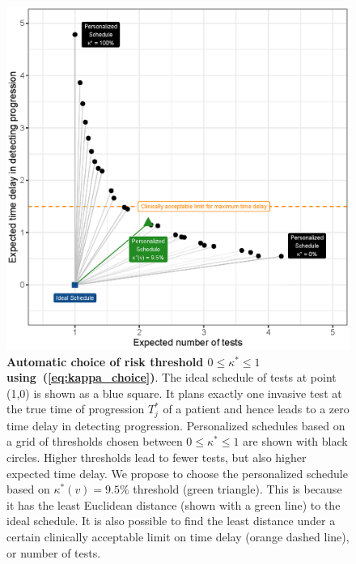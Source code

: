 \begin{figure}
\centerline{\includegraphics{images/kappa_choice_102.eps}}
\caption{\textbf{Automatic choice of risk threshold $0 \leq \kappa^* \leq 1$ using~(\ref{eq:kappa_choice})}. The ideal schedule of tests at point (1,0) is shown as a blue square. It plans exactly one invasive test at the true time of progression $T^*_j$ of a patient and hence leads to a zero time delay in detecting progression. Personalized schedules based on a grid of thresholds chosen between $0 \leq \kappa^* \leq 1$ are shown with black circles. Higher thresholds lead to fewer tests, but also higher expected time delay. We propose to choose the personalized schedule based on $\kappa^*(v)=9.5\%$ threshold (green triangle). This is because it has the least Euclidean distance (shown with a green line) to the ideal schedule. It is also possible to find the least distance under a certain clinically acceptable limit on time delay (orange dashed line), or number of tests.}
\label{fig:kappa_choice}
\end{figure}